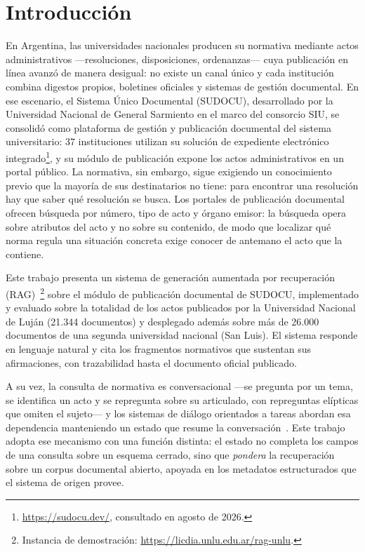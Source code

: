 \documentclass{llncs}
\begin{document}
\section{Introducción}
\label{sec:intro}

En Argentina, las universidades nacionales producen su normativa mediante actos
administrativos ---resoluciones, disposiciones, ordenanzas--- cuya publicación
en línea avanzó de manera desigual: no existe un canal único y cada
institución combina digestos propios, boletines oficiales y sistemas de
gestión documental. En ese escenario, el Sistema Único Documental (SUDOCU),
desarrollado por la Universidad Nacional de General Sarmiento en el marco del
consorcio SIU, se consolidó como plataforma de gestión y publicación
documental del sistema universitario: 37 instituciones utilizan su solución de
expediente electrónico integrado\footnote{\url{https://sudocu.dev/}, consultado
en agosto de 2026.}, y su módulo de publicación expone los actos
administrativos en un portal público. La normativa, sin embargo, sigue exigiendo
un conocimiento previo que la mayoría de sus destinatarios no tiene: para
encontrar una resolución hay que saber qué resolución se busca. Los portales de publicación
documental ofrecen búsqueda por número, tipo de acto y órgano emisor: la
búsqueda opera sobre atributos del acto y no sobre su contenido, de modo que
localizar qué norma regula una situación concreta exige conocer de antemano el
acto que la contiene.

Este trabajo presenta un sistema de generación aumentada por recuperación
(RAG)~\cite{lewis2020rag}\footnote{Instancia de demostración:
\url{https://licdia.unlu.edu.ar/rag-unlu}.} sobre el módulo de publicación documental de SUDOCU,
implementado y evaluado sobre la totalidad de los actos publicados por la
Universidad Nacional de Luján (21.344 documentos) y desplegado además sobre
más de 26.000 documentos de una segunda universidad nacional (San Luis). El
sistema responde en lenguaje natural y cita los fragmentos normativos que
sustentan sus afirmaciones, con trazabilidad hasta el documento oficial
publicado.

A su vez, la consulta de normativa es conversacional ---se pregunta por un tema,
se identifica un acto y se repregunta sobre su articulado, con repreguntas
elípticas que omiten el sujeto--- y los sistemas de diálogo orientados a
tareas abordan esa dependencia manteniendo un estado que resume la
conversación~\cite{young2013pomdp,williams2013pomdp}.
Este trabajo adopta ese mecanismo con una función distinta: el estado no completa
los campos de una consulta sobre un esquema cerrado, sino que \emph{pondera} la
recuperación sobre un corpus documental abierto, apoyada en los metadatos
estructurados que el sistema de origen provee.
\end{document}

